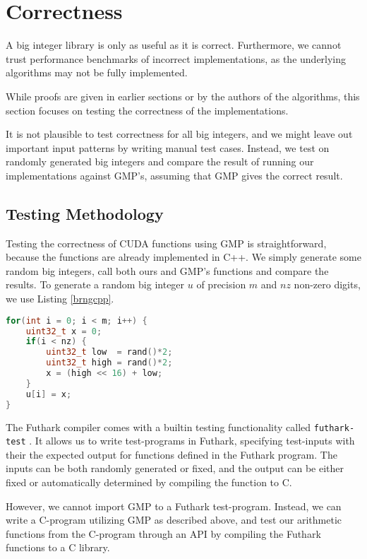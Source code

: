 \section{Correctness}
\label{sec:cor}

A big integer library is only as useful as it is correct. Furthermore, we cannot
trust performance benchmarks of incorrect implementations, as the underlying
algorithms may not be fully implemented.

While proofs are given in earlier sections or by the authors of the algorithms,
this section focuses on testing the correctness of the implementations.

It is not plausible to test correctness for all big integers, and we might leave
out important input patterns by writing manual test cases. Instead, we test on
randomly generated big integers and compare the result of running our
implementations against GMP's, assuming that GMP gives the correct result.

\subsection{Testing Methodology}

Testing the correctness of CUDA functions using GMP is straightforward, because
the functions are already implemented in C++. We simply generate some random big
integers, call both ours and GMP's functions and compare the results. To
generate a random big integer $u$ of precision $m$ and $\mathit{nz}$ non-zero
digits, we use Listing \ref{brngcpp}.

\begin{lstlisting}[language=CPP, caption={Random big integer generator in C++.}, label={brngcpp}]
for(int i = 0; i < m; i++) {
    uint32_t x = 0;
    if(i < nz) {
        uint32_t low  = rand()*2;
        uint32_t high = rand()*2;
        x = (high << 16) + low;
    }
    u[i] = x;
}
\end{lstlisting}

The Futhark compiler comes with a builtin testing functionality called
\texttt{futhark-test} \cite{futguide}. It allows us to write test-programs in
Futhark, specifying test-inputs with their the expected output for functions
defined in the Futhark program. The inputs can be both randomly generated or
fixed, and the output can be either fixed or automatically determined by
compiling the function to C.

However, we cannot import GMP to a Futhark test-program. Instead, we can write a
C-program utilizing GMP as described above, and test our arithmetic functions
from the C-program through an API by compiling the Futhark functions to a C
library.

